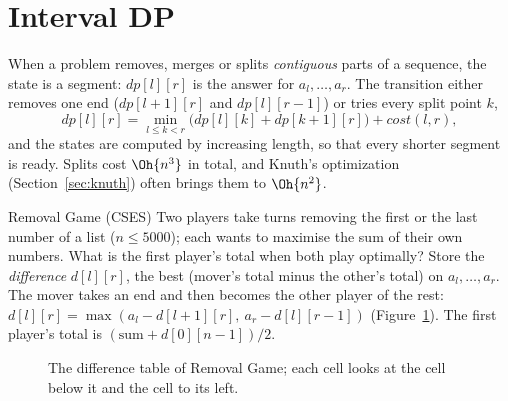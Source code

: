 \section[Interval DP]{Interval DP \hfill \gold}\label{sec:intervaldp}

When a problem removes, merges or splits \emph{contiguous} parts of a sequence, the state is a segment: $dp[l][r]$ is the answer for
$a_l, \dots, a_r$. The transition either removes one end ($dp[l+1][r]$ and $dp[l][r-1]$) or tries every split point $k$,
\[ dp[l][r] = \min_{l \le k < r} \bigl(dp[l][k] + dp[k+1][r]\bigr) + \mathit{cost}(l, r), \]
and the states are computed by increasing length, so that every shorter segment is ready. Splits cost $\Oh{n^3}$ in total, and
Knuth's optimization (Section~\ref{sec:knuth}) often brings them to $\Oh{n^2}$.

\begin{problem}{Removal Game (CSES)}
Two players take turns removing the first or the last number of a list ($n \le 5000$); each wants to maximise the sum of their own
numbers. What is the first player's total when both play optimally?
\solution Store the \emph{difference} $d[l][r]$, the best (mover's total minus the other's total) on $a_l, \dots, a_r$. The mover
takes an end and then becomes the other player of the rest: $d[l][r] = \max(a_l - d[l+1][r],\ a_r - d[l][r-1])$
(Figure~\ref{fig:removal}). The first player's total is $(\text{sum} + d[0][n-1])/2$.
\end{problem}

\begin{figure}[htbp]
\centering
{}
\caption{The difference table of Removal Game; each cell looks at the cell below it and the cell to its left.}
\label{fig:removal}
\end{figure}

